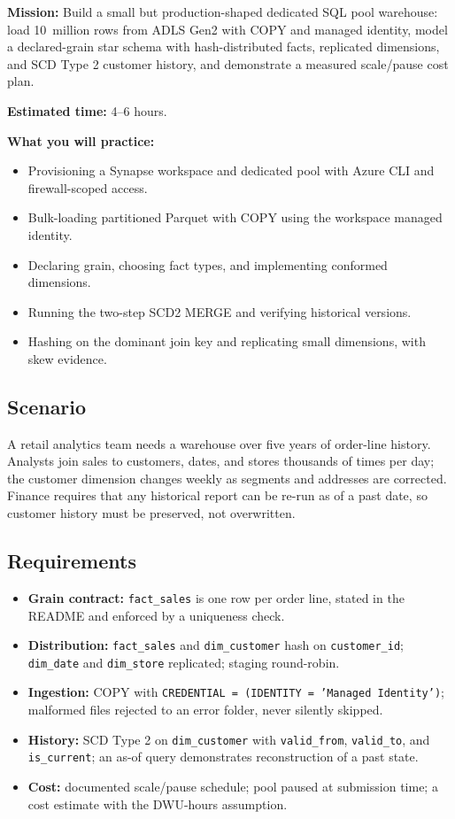 \begin{capstonebox}
\textbf{Mission:} Build a small but production-shaped dedicated SQL pool warehouse: load 10~million rows from ADLS Gen2 with COPY and managed identity, model a declared-grain star schema with hash-distributed facts, replicated dimensions, and SCD Type 2 customer history, and demonstrate a measured scale/pause cost plan.

\textbf{Estimated time:} 4--6 hours.

\textbf{What you will practice:}
\begin{itemize}
    \item Provisioning a Synapse workspace and dedicated pool with Azure CLI and firewall-scoped access.
    \item Bulk-loading partitioned Parquet with COPY using the workspace managed identity.
    \item Declaring grain, choosing fact types, and implementing conformed dimensions.
    \item Running the two-step SCD2 MERGE and verifying historical versions.
    \item Hashing on the dominant join key and replicating small dimensions, with skew evidence.
\end{itemize}
\end{capstonebox}

\subsection*{Scenario}
A retail analytics team needs a warehouse over five years of order-line history. Analysts join sales to customers, dates, and stores thousands of times per day; the customer dimension changes weekly as segments and addresses are corrected. Finance requires that any historical report can be re-run as of a past date, so customer history must be preserved, not overwritten.

\subsection*{Requirements}
\begin{itemize}
    \item \textbf{Grain contract:} \texttt{fact\_sales} is one row per order line, stated in the README and enforced by a uniqueness check.
    \item \textbf{Distribution:} \texttt{fact\_sales} and \texttt{dim\_customer} hash on \texttt{customer\_id}; \texttt{dim\_date} and \texttt{dim\_store} replicated; staging round-robin.
    \item \textbf{Ingestion:} COPY with \texttt{CREDENTIAL = (IDENTITY = 'Managed Identity')}; malformed files rejected to an error folder, never silently skipped.
    \item \textbf{History:} SCD Type 2 on \texttt{dim\_customer} with \texttt{valid\_from}, \texttt{valid\_to}, and \texttt{is\_current}; an as-of query demonstrates reconstruction of a past state.
    \item \textbf{Cost:} documented scale/pause schedule; pool paused at submission time; a cost estimate with the DWU-hours assumption.
\end{itemize}

